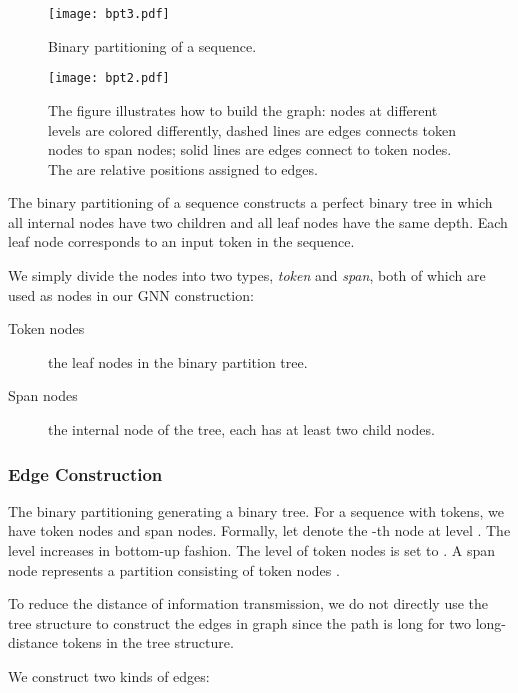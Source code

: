 \documentclass[11pt,a4paper]{article}
\begin{document}
\begin{figure}[!htb]
\centering
\texttt{[image: bpt3.pdf]}
\caption{Binary partitioning of a sequence.}
\label{fig:bpt3}
\end{figure}



 \begin{figure*}[!htb]
\centering
\texttt{[image: bpt2.pdf]}
\caption{The figure illustrates how to build the graph: nodes at different levels are colored differently, dashed lines are edges connects token nodes to span nodes; solid lines are edges connect to token nodes. The  are relative positions assigned to edges.}
\label{fig:tree}
\end{figure*}

The binary partitioning of a sequence constructs a perfect binary tree in which all internal nodes have two children and all leaf nodes have the same depth. Each leaf node corresponds to an input token in the sequence.

We simply divide the nodes into two types, \emph{token} and \emph{span}, both of which are used as nodes in our GNN construction:
\begin{description}
    \item [Token nodes] the leaf nodes in the binary partition tree.
    \item [Span nodes] the internal node of the tree, each has at least two child nodes.
\end{description}







\subsubsection{Edge Construction}

The binary partitioning generating a binary tree. For a sequence with  tokens, we have  token nodes and  span nodes. Formally, let  denote the -th node at level . The level increases in bottom-up fashion. The level of token nodes is set to .
A span node  represents a partition consisting of token nodes .

To reduce the distance of information transmission, we do not directly use the tree structure to construct the edges in graph since the path is long for two long-distance tokens in the tree structure.



We construct two kinds of edges:
\end{document}
